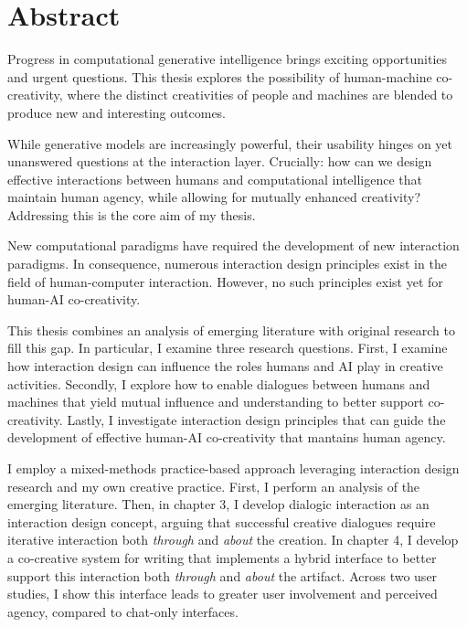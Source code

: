 \chapter{Abstract}

Progress in computational generative intelligence brings exciting opportunities and urgent questions. This thesis explores the possibility of human-machine co-creativity, where the distinct creativities of people and machines are blended to produce new and interesting outcomes.

While generative models are increasingly powerful, their usability hinges on yet unanswered questions at the interaction layer. Crucially: how can we design effective interactions between humans and computational intelligence that maintain human agency, while allowing for mutually enhanced creativity? Addressing this is the core aim of my thesis.

New computational paradigms have required the development of new interaction paradigms. In consequence, numerous interaction design principles exist in the field of human-computer interaction. However, no such principles exist yet for human-AI co-creativity.

This thesis combines an analysis of emerging literature with original research to fill this gap. In particular, I examine three research questions. First, I examine how interaction design can influence the roles humans and AI play in creative activities. Secondly, I explore how to enable dialogues between humans and machines that yield mutual influence and understanding to better support co-creativity. Lastly, I investigate interaction design principles that can guide the development of effective human-AI co-creativity that mantains human agency. 

I employ a mixed-methods practice-based approach leveraging interaction design research and my own creative practice. First, I perform an analysis of the emerging literature. Then, in chapter 3, I develop dialogic interaction as an interaction design concept, arguing that successful creative dialogues require iterative interaction both \textit{through} and \textit{about} the creation. In chapter 4, I develop a co-creative system for writing that implements a hybrid interface to better support this interaction both \textit{through} and \textit{about} the artifact. Across two user studies, I show this interface leads to greater user involvement and perceived agency, compared to chat-only interfaces. 

